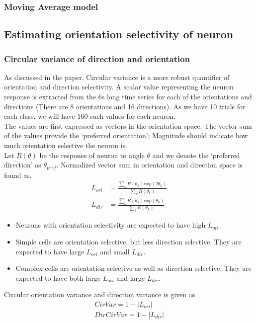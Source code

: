 \documentclass[11pt]{article}
\begin{document}
\subsubsection{Moving Average model} %
\label{ssub:moving_average_model}


\subsection{Estimating orientation selectivity of neuron} %
\label{sub:estimating_orientation_selectivity_of_neuron}
\subsubsection{Circular variance of direction and orientation} %
\label{ssub:circular_variance_of_direction_and_orientation}
As discussed in the paper, Circular variance is a more robust quantifier of orientation and direction selectivity. A scalar value representing the neuron response is extracted from the 6s long time series for each of the orientations and directions (There are 8 orientations and 16 directions). As we have 10 trials for each class, we will have 160 such values for each neuron.\\
The values are first expressed as vectors in the orientation space. The vector sum of the values provide the `preferred orientation'; Magnitude should indicate how much orientation selective the neuron is.\\
Let $R(\theta)$ be the response of neuron to angle $\theta$ and we denote the `preferred direction' as $\theta_{pref}$.
Normalized vector sum in orientation and direction space is found as.
\begin{align}
    L_{ori} &= \frac{\sum_{k} R(\theta_k) exp(2\theta_k)}{\sum_{k} R(\theta_k)}\\
    L_{dir} &= \frac{\sum_{k} R(\theta_k) exp(\theta_k)}{\sum_{k} R(\theta_k)}
\end{align}
\begin{itemize}
    \item Neurons with orientation selectivity are expected to have high $L_{ori}$.
    \item Simple cells are orientation selective, but less direction selective. They are expected to have large $L_{ori}$ and small $L_{dir}$.
    \item Complex cells are orientation selective as well as direction selective. They are expected to have both large $L_{ori}$ and large $L_{dir}$.
\end{itemize}
Circular orientation variance and direction variance is given as
\begin{align}
    CirVar = 1 - |L_{ori}|\\
    DirCirVar = 1- |L_{dir}|
\end{align}
\end{document}
